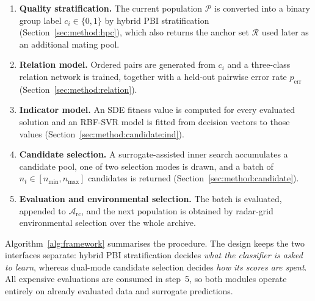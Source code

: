 \documentclass[11pt,a4paper]{article}
\begin{document}
\begin{enumerate}[leftmargin=*,itemsep=2pt]
\item \textbf{Quality stratification.} The current population $\mathcal{P}$ is
      converted into a binary group label $c_i\in\{0,1\}$ by hybrid PBI
      stratification (Section~\ref{sec:method:hpc}), which also returns the
      anchor set $\mathcal{R}$ used later as an additional mating pool.
\item \textbf{Relation model.} Ordered pairs are generated from $c_i$ and a
      three-class relation network is trained, together with a held-out
      pairwise error rate $p_{\mathrm{err}}$
      (Section~\ref{sec:method:relation}).
\item \textbf{Indicator model.} An SDE fitness value is computed for every
      evaluated solution and an RBF-SVR model is fitted from decision vectors
      to those values (Section~\ref{sec:method:candidate:ind}).
\item \textbf{Candidate selection.} A surrogate-assisted inner search
      accumulates a candidate pool, one of two selection modes is drawn, and a
      batch of $n_t\in[n_{\min},n_{\max}]$ candidates is returned
      (Section~\ref{sec:method:candidate}).
\item \textbf{Evaluation and environmental selection.} The batch is evaluated,
      appended to $\mathcal{A}_{\mathrm{rc}}$, and the next population is
      obtained by radar-grid environmental selection over the whole archive.
\end{enumerate}

Algorithm~\ref{alg:framework} summarises the procedure. The design keeps the
two interfaces separate: hybrid PBI stratification decides \emph{what the
classifier is asked to learn}, whereas dual-mode candidate selection decides
\emph{how its scores are spent}. All expensive evaluations are consumed in
step~5, so both modules operate entirely on already evaluated data and
surrogate predictions.
\end{document}
